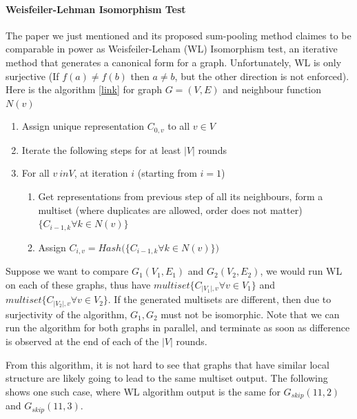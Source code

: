 \paragraph{Weisfeiler-Lehman Isomorphism Test} The paper we just mentioned and its proposed sum-pooling method claimes to be comparable in power as Weisfeiler-Leham (WL) Isomorphism test, an iterative method that generates a canonical form for a graph. Unfortunately, WL is only surjective (If $f(a) \neq f(b)$ then $a \neq b$, but the other direction is not enforced). Here is the algorithm \href{https://www.davidbieber.com/post/2019-05-10-weisfeiler-lehman-isomorphism-test/}{[link]} for graph $G=(V, E)$ and neighbour function $N(v)$

\begin{enumerate}
    \item Assign unique representation $C_{0, v}$ to all $v \in V$
    
    \item Iterate the following steps for at least $|V|$ rounds
    
    \item For all $v\ in V$, at iteration $i$ (starting from $i=1$)
    
    \begin{enumerate}
        \item Get representations from previous step of all its neighbours, form a multiset (where duplicates are allowed, order does not matter) $\{C_{i-1, k} \forall k \in N(v)\}$
    
        \item Assign $C_{i, v} = Hash\Big( \{C_{i-1, k} \forall k \in N(v)\} \Big)$
    \end{enumerate}{}
\end{enumerate}{}

Suppose we want to compare $G_1(V_1, E_1)$ and $G_2(V_2, E_2)$, we would run WL on each of these graphs, thus have $multiset\{C_{|V_1|, v} \forall v \in V_1\}$ and $multiset\{C_{|V_2|, v} \forall v \in V_2\}$. If the generated multisets are different, then due to surjectivity of the algorithm, $G_1, G_2$ must not be isomorphic. Note that we can run the algorithm for both graphs in parallel, and terminate as soon as difference is observed at the end of each of the $|V|$ rounds.

From this algorithm, it is not hard to see that graphs that have similar local structure are likely going to lead to the same multiset output. The following shows one such case, where WL algorithm output is the same for $G_{skip}(11, 2)$ and $G_{skip}(11, 3)$.

